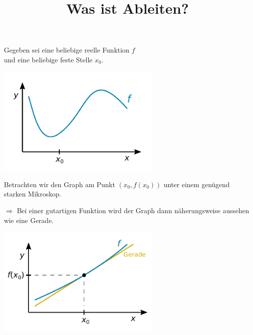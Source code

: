 \documentclass{beamer}
\title{Was ist Ableiten?}
\date{}
\begin{document}
\begin{frame}
\maketitle
\end{frame}

\begin{frame}[t]
\vspace{2em}
Gegeben sei eine beliebige reelle Funktion $f$\\
und eine beliebige feste Stelle $x_0$.\pause

\vspace{-1em}
\begin{center}
\includegraphics[width=80mm]{img/Funktion.pdf}
\end{center}

\end{frame}

\begin{frame}[t]
\vspace{1em}

Betrachten wir den Graph am Punkt $(x_0,f(x_0))$ unter einem
genügend starken Mikroskop.\pause

\vspace{0.5em}
$\Longrightarrow$ Bei einer gutartigen Funktion wird der Graph dann näherungsweise
aussehen wie eine Gerade.\pause

\vspace{-1em}
\begin{center}
\includegraphics[width=80mm]{img/Funktion-Tangente.pdf}
\end{center}
\end{frame}
\end{document}
